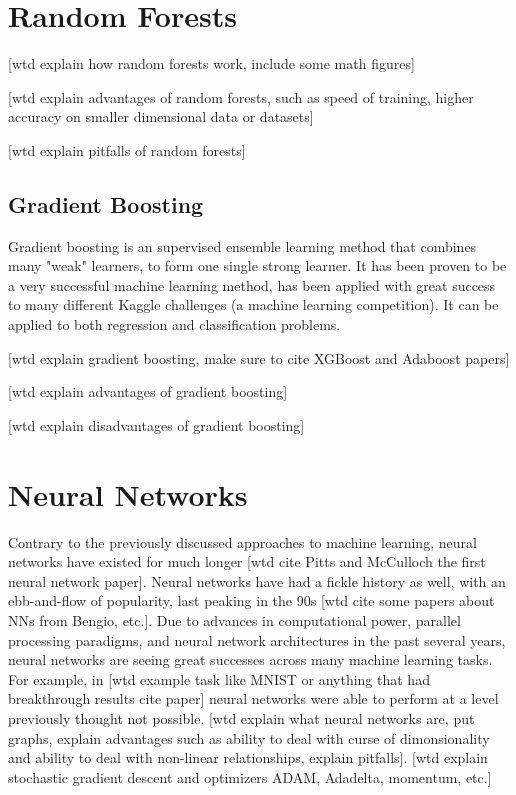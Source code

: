 \documentclass[a4paper,11pt,twoside]{scrbook}
\begin{document}
\section{Random Forests}

[wtd explain how random forests work, include some math figures]

[wtd explain advantages of random forests, such as speed of training, higher accuracy on smaller dimensional data or datasets]

[wtd explain pitfalls of random forests]

\subsection{Gradient Boosting}

Gradient boosting is an supervised ensemble learning method that combines many "weak" learners, to form one single strong learner.  It has been proven to be a very successful machine learning method, has been applied with great success to many different Kaggle challenges (a machine learning competition).  It can be applied to both regression and classification problems.

[wtd explain gradient boosting, make sure to cite XGBoost and Adaboost papers]

[wtd explain advantages of gradient boosting]

[wtd explain disadvantages of gradient boosting]

\section{Neural Networks}

Contrary to the previously discussed approaches to machine learning, neural networks have existed for much longer [wtd cite Pitts and McCulloch the first neural network paper].  Neural networks have had a fickle history as well, with an ebb-and-flow of popularity, last peaking in the 90s [wtd cite some papers about NNs from Bengio, etc.].  Due to advances in computational power, parallel processing paradigms, and neural network architectures in the past several years, neural networks are seeing great successes across many machine learning tasks.  For example, in [wtd example task like MNIST or anything that had breakthrough results cite paper] neural networks were able to perform at a level previously thought not possible.  [wtd explain what neural networks are, put graphs, explain advantages such as ability to deal with curse of dimonsionality and ability to deal with non-linear relationships, explain pitfalls]. [wtd explain stochastic gradient descent and optimizers ADAM, Adadelta, momentum, etc.]
\end{document}
